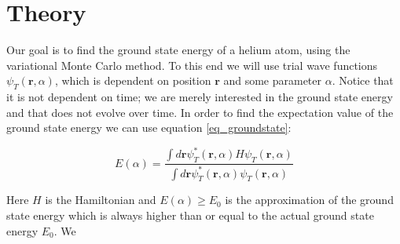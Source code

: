 

\section{Theory}

Our goal is to find the ground state energy of a helium atom, using the variational Monte Carlo method. To this end we will use trial wave functions $\psi_T(\textbf{r},\alpha)$, which is dependent on position $\textbf{r}$ and some parameter $\alpha$. Notice that it is not dependent on time; we are merely interested in the ground state energy and that does not evolve over time. In order to find the expectation value of the ground state energy we can use equation \ref{eq_groundstate}: 

\begin{equation}\label{eq_groundstate}
E(\alpha) = \frac{\int d\textbf{r} \psi_T^*(\textbf{r},\alpha)H\psi_T(\textbf{r},\alpha)}{\int d\textbf{r} \psi_T^*(\textbf{r},\alpha)\psi_T(\textbf{r},\alpha)}
\end{equation}

Here $H$ is the Hamiltonian and $E(\alpha) \geq E_0$ is the approximation of the ground state energy which is always higher than or equal to the actual ground state energy $E_0$.  We 